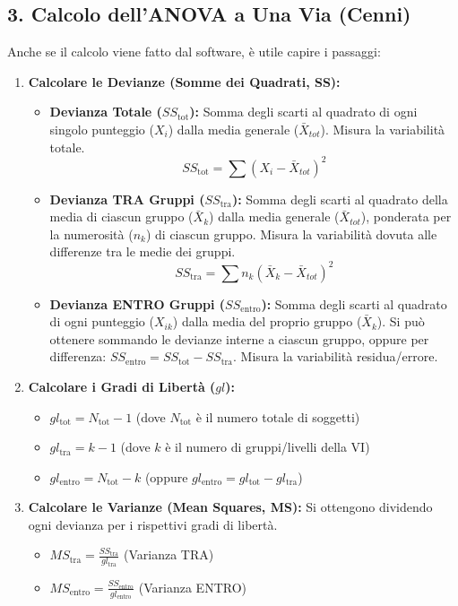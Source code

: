 \documentclass[12pt, a4paper]{article}
\newcommand{\df}{gl} %
\newcommand{\SSb}{SS_{\text{tra}}} %
\newcommand{\SSw}{SS_{\text{entro}}} %
\newcommand{\SStot}{SS_{\text{tot}}} %
\newcommand{\MSb}{MS_{\text{tra}}} %
\newcommand{\MSw}{MS_{\text{entro}}} %
\newcommand{\kgr}{k} %
\newcommand{\Ntot}{N_{\text{tot}}} %
\newcommand{\dfb}{\df_{\text{tra}}} %
\newcommand{\dfw}{\df_{\text{entro}}} %
\newcommand{\dftot}{\df_{\text{tot}}} %
\begin{document}
\subsection*{3. Calcolo dell'ANOVA a Una Via (Cenni)}
Anche se il calcolo viene fatto dal software, è utile capire i passaggi:
\begin{enumerate}
    \item \textbf{Calcolare le Devianze (Somme dei Quadrati, SS):}
        \begin{itemize}
            \item \textbf{Devianza Totale ($\SStot$):} Somma degli scarti al quadrato di ogni singolo punteggio ($X_i$) dalla media generale ($\bar{X}_{tot}$). Misura la variabilità totale.
              $$ \SStot = \sum (X_i - \bar{X}_{tot})^2 $$
            \item \textbf{Devianza TRA Gruppi ($\SSb$):} Somma degli scarti al quadrato della media di ciascun gruppo ($\bar{X}_k$) dalla media generale ($\bar{X}_{tot}$), ponderata per la numerosità ($n_k$) di ciascun gruppo. Misura la variabilità dovuta alle differenze tra le medie dei gruppi.
              $$ \SSb = \sum n_k (\bar{X}_k - \bar{X}_{tot})^2 $$
            \item \textbf{Devianza ENTRO Gruppi ($\SSw$):} Somma degli scarti al quadrato di ogni punteggio ($X_{ik}$) dalla media del proprio gruppo ($\bar{X}_k$). Si può ottenere sommando le devianze interne a ciascun gruppo, oppure per differenza: $\SSw = \SStot - \SSb$. Misura la variabilità residua/errore.
        \end{itemize}
    \item \textbf{Calcolare i Gradi di Libertà ($\df$):}
        \begin{itemize}
            \item $\dftot = \Ntot - 1$ (dove $\Ntot$ è il numero totale di soggetti)
            \item $\dfb = \kgr - 1$ (dove $\kgr$ è il numero di gruppi/livelli della VI)
            \item $\dfw = \Ntot - \kgr$ (oppure $\dfw = \dftot - \dfb$)
        \end{itemize}
    \item \textbf{Calcolare le Varianze (Mean Squares, MS):} Si ottengono dividendo ogni devianza per i rispettivi gradi di libertà.
        \begin{itemize}
            \item $\MSb = \frac{\SSb}{\dfb}$ (Varianza TRA)
            \item $\MSw = \frac{\SSw}{\dfw}$ (Varianza ENTRO)

\end{itemize}
\end{enumerate}
\end{document}
